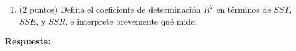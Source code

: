 \documentclass[10pt,a4paper]{article}
\begin{document}
\begin{enumerate}
\begin{enumerate}
            \medskip
            \textit{Hint:} Note que
                $
                    y_i
                    -
                    \bar y
                    =
                    \left(
                        \hat y_i
                        -
                        \bar y
                    \right)
                    +
                    \hat u_i
                $.

        \smallskip
        \item (2 puntos) Defina el coeficiente de determinación $R^2$ en términos de $SST$, $SSE$, y $SSR$, e interprete brevemente qué mide.
        
    \end{enumerate}

    {
        \color{blue}
        \textbf{Respuesta:}
        \begin{enumerate}


\end{enumerate}}
\end{enumerate}
\end{document}
